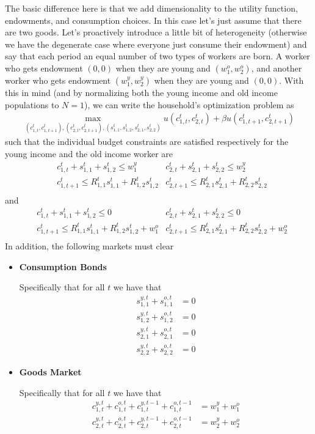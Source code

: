 \documentclass[11pt,english]{article}
\begin{document}
The basic difference here is that we add dimensionality to the utility function, endowments, and consumption choices. In this case let's just assume that there are two goods. Let's proactively introduce a little bit of heterogeneity (otherwise we have the degenerate case where everyone just consume their endowment) and say that each period an equal number of two types of workers are born. A worker who gets endowment $(0,0)$ when they are young and $(w_1^o, w_2^o)$, and another worker who gets endowment $(w_1^y,w_2^y)$ when they are young and $(0, 0)$. With this in mind (and by normalizing both the young income and old income populations to $N=1$), we can write the household's optimization problem as
\begin{align*}
	\max_{(c_{1,t}^t, c_{1,t+1}^t), (c_{2,t}^t, c_{2,t+1}^t), (s_{1,1}^t, s_{1,2}^t, s_{2,1}^t, s_{2,2}^t)} u(c_{1,t}^t, c_{2,t}^t) + \beta u(c_{1,t+1}^t, c_{2,t+1}^t)
\end{align*} such that the individual budget constraints are satisfied respectively for the young income and the old income worker are
\begin{align*}
	&c_{1,t}^t + s_{1,1}^t + s_{1,2}^t \leq w_1^y			&c_{2,t}^t + s_{2,1}^t + s_{2,2}^t \leq w_2^y\\
	&c_{1,t+1}^t \leq R_{1,1}^ts_{1,1}^t + R_{1,2}^t s_{1,2}^t 		&c_{2,t+1}^t \leq R_{2,1}^ts_{2,1}^t + R_{2,2}^ts_{2,2}^t\\
\end{align*}
and
\begin{align*}
	&c_{1,t}^t + s_{1,1}^t + s_{1,2}^t \leq 0			&c_{2,t}^t + s_{2,1}^t + s_{2,2}^t \leq 0\\
	&c_{1,t+1}^t \leq R_{1,1}^ts_{1,1}^t + R_{1,2}^t s_{1,2}^t 	+ w_1^o	&c_{2,t+1}^t \leq R_{2,1}^ts_{2,1}^t + R_{2,2}^ts_{2,2}^t + w_2^o\\
\end{align*}
In addition, the following markets must clear
\begin{itemize}
	\item \textbf{Consumption Bonds}
	
	Specifically that for all $t$ we have that \begin{align*}
		s_{1,1}^{y,t} + s_{1,1}^{o,t} &= 0 \\
		s_{1,2}^{y,t} + s_{1,2}^{o,t} &= 0 \\
		s_{2,1}^{y,t} + s_{2,1}^{o,t} &= 0 \\
		s_{2,2}^{y,t} + s_{2,2}^{o,t} &= 0
	\end{align*}

	\item \textbf{Goods Market} 

	Specifically that for all $t$ we have that \begin{align*}
		c_{1,t}^{y,t} + c_{1,t}^{o,t} + c_{1,t}^{y,t-1} + c_{1,t}^{o,t-1} &= w_1^y + w_1^o \\
		c_{2,t}^{y,t} + c_{2,t}^{o,t} + c_{2,t}^{y,t-1} + c_{2,t}^{o,t-1} &= w_2^y + w_2^o \\
	\end{align*}
\end{itemize}
\end{document}
